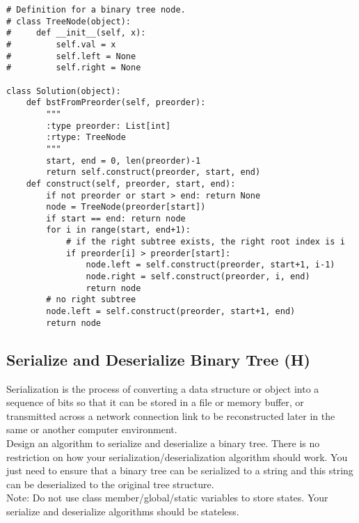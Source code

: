 \begin{lstlisting}
# Definition for a binary tree node.
# class TreeNode(object):
#     def __init__(self, x):
#         self.val = x
#         self.left = None
#         self.right = None

class Solution(object):
    def bstFromPreorder(self, preorder):
        """
        :type preorder: List[int]
        :rtype: TreeNode
        """
        start, end = 0, len(preorder)-1
        return self.construct(preorder, start, end)
    def construct(self, preorder, start, end):
        if not preorder or start > end: return None
        node = TreeNode(preorder[start])
        if start == end: return node
        for i in range(start, end+1):
            # if the right subtree exists, the right root index is i
            if preorder[i] > preorder[start]: 
                node.left = self.construct(preorder, start+1, i-1)
                node.right = self.construct(preorder, i, end)
                return node
        # no right subtree
        node.left = self.construct(preorder, start+1, end)
        return node
\end{lstlisting}

\subsection{Serialize and Deserialize Binary Tree (H)}
Serialization is the process of converting a data structure or object into a sequence of bits so that it can be stored in a file or memory buffer, or transmitted across a network connection link to be reconstructed later in the same or another computer environment.\\

Design an algorithm to serialize and deserialize a binary tree. There is no restriction on how your serialization/deserialization algorithm should work. You just need to ensure that a binary tree can be serialized to a string and this string can be deserialized to the original tree structure.\\

Note: Do not use class member/global/static variables to store states. Your serialize and deserialize algorithms should be stateless. \\

